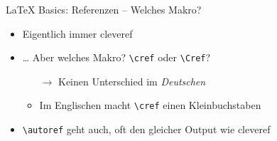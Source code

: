 \documentclass[main.tex]{subfiles}
\begin{document}
\begin{frame}[fragile]{\LaTeX{} Basics: Referenzen -- Welches Makro?}
    \begin{itemize}
        \pause
        \item Eigentlich immer cleveref\medskip
        \pause
        \item \ldots{} Aber welches Makro? \verb|\cref| oder \verb|\Cref|?
        \pause
        \begin{itemize}
            \item[$\to$] Keinen Unterschied im \textit{Deutschen}
            \item Im Englischen macht \verb|\cref| einen Kleinbuchstaben
        \end{itemize}
        \pause
        \medskip
        \item \verb|\autoref| geht auch, oft den gleicher Output wie cleveref
    \end{itemize}
\end{frame}
\end{document}

